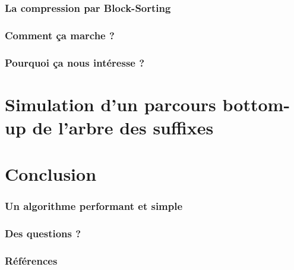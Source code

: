 \documentclass[10pt]{beamer}
\begin{document}
\begin{frame}
  \frametitle{La compression par Block-Sorting}
\end{frame}

\begin{frame}
  \frametitle{Comment ça marche ?}
\end{frame}

\begin{frame}
  \frametitle{Pourquoi ça nous intéresse ?}
\end{frame}



\section{Simulation d'un parcours bottom-up de l'arbre des suffixes}
\label{sec:appbottomup}


\section{Conclusion}
\label{sec:conclusion}

\begin{frame}
  \frametitle{Un algorithme performant et simple}
\end{frame}

\begin{frame}
  \frametitle{Des questions ?}
\end{frame}

\begin{frame}
  \frametitle{Références}
\end{frame}
\end{document}
